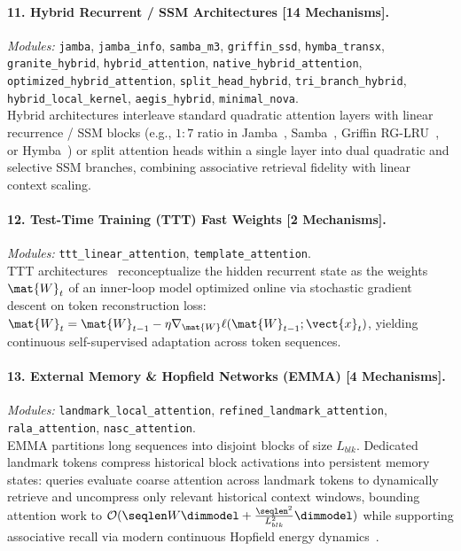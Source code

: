 \paragraph{11. Hybrid Recurrent / SSM Architectures [14 Mechanisms].}
\textit{Modules:} \texttt{jamba}, \texttt{jamba\_info}, \texttt{samba\_m3}, \texttt{griffin\_ssd}, \texttt{hymba\_transx}, \texttt{granite\_hybrid}, \texttt{hybrid\_attention}, \texttt{native\_hybrid\_attention}, \texttt{optimized\_hybrid\_attention}, \texttt{split\_head\_hybrid}, \texttt{tri\_branch\_hybrid}, \texttt{hybrid\_local\_kernel}, \texttt{aegis\_hybrid}, \texttt{minimal\_nova}. \\
Hybrid architectures interleave standard quadratic attention layers with linear recurrence / SSM blocks (e.g., $1:7$ ratio in Jamba~\cite{lieber2024jamba}, Samba~\cite{ren2024samba}, Griffin RG-LRU~\cite{de2024griffin}, or Hymba~\cite{dong2024hymba}) or split attention heads within a single layer into dual quadratic and selective SSM branches, combining associative retrieval fidelity with linear context scaling.

\paragraph{12. Test-Time Training (TTT) Fast Weights [2 Mechanisms].}
\textit{Modules:} \texttt{ttt\_linear\_attention}, \texttt{template\_attention}. \\
TTT architectures~\cite{sun2024ttt} reconceptualize the hidden recurrent state as the weights $\mat{W}_t$ of an inner-loop model optimized online via stochastic gradient descent on token reconstruction loss: $\mat{W}_t = \mat{W}_{t-1} - \eta \nabla_\mat{W} \ell(\mat{W}_{t-1}; \vect{x}_t)$, yielding continuous self-supervised adaptation across token sequences.

\paragraph{13. External Memory \& Hopfield Networks (EMMA) [4 Mechanisms].}
\textit{Modules:} \texttt{landmark\_local\_attention}, \texttt{refined\_landmark\_attention}, \texttt{rala\_attention}, \texttt{nasc\_attention}. \\
EMMA partitions long sequences into disjoint blocks of size $L_{blk}$. Dedicated landmark tokens compress historical block activations into persistent memory states: queries evaluate coarse attention across landmark tokens to dynamically retrieve and uncompress only relevant historical context windows, bounding attention work to $\mathcal{O}(\seqlen W \dimmodel + \frac{\seqlen^2}{L_{blk}^2} \dimmodel)$ while supporting associative recall via modern continuous Hopfield energy dynamics~\cite{ramsauer2020hopfield}.

